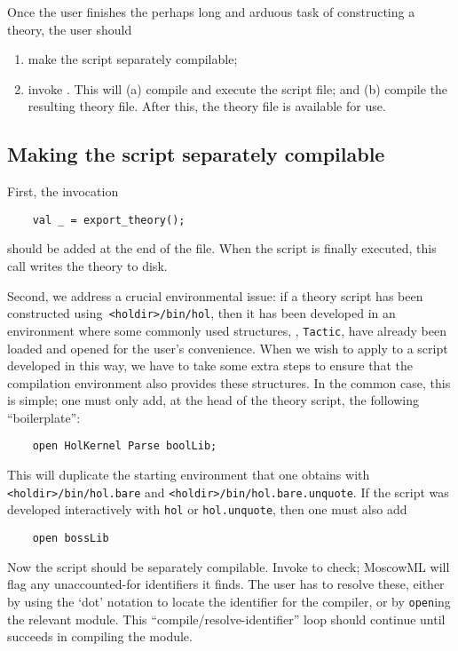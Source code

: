 Once the user finishes the perhaps long and arduous task of constructing
a theory, the user should
\begin{enumerate}
\item make the script separately compilable;
\item invoke \holmake{}. This will (a) compile and execute the
  script file; and (b) compile the resulting theory file. After this,
  the theory file is available for use.
\end{enumerate}

\subsection{Making the script separately compilable}

First, the invocation
\begin{verbatim}
    val _ = export_theory();
\end{verbatim}
should be added at the end of the file. When the script is finally
executed, this call writes the theory to disk.

Second, we address a crucial environmental issue: if a theory script
has been constructed using\verb+ <holdir>/bin/hol+, then it has been
developed in an environment where some commonly used structures, \eg,
\verb+Tactic+, have already been loaded and opened for the user's
convenience. When we wish to apply \holmake{} to a script developed
in this way, we have to take some extra steps to ensure that the
compilation environment also provides these structures.  In the common
case, this is simple; one must only add, at the head of the theory
script, the following ``boilerplate'':
\begin{verbatim}
    open HolKernel Parse boolLib;
\end{verbatim}
This will duplicate the starting environment that one obtains with
\verb+<holdir>/bin/hol.bare+ and
\verb+<holdir>/bin/hol.bare.unquote+.  If the script was developed
interactively with \texttt{hol} or \texttt{hol.unquote}, then one must
also add
\begin{verbatim}
    open bossLib
\end{verbatim}
Now the script should be separately compilable. Invoke \holmake{}
to check; MoscowML will flag any unaccounted-for identifiers it finds.
The user has to resolve these, either by using the `dot' notation to
locate the identifier for the compiler, or by \verb+open+ing the
relevant module. This ``compile/resolve-identifier'' loop should
continue until \holmake{} succeeds in compiling the module.

